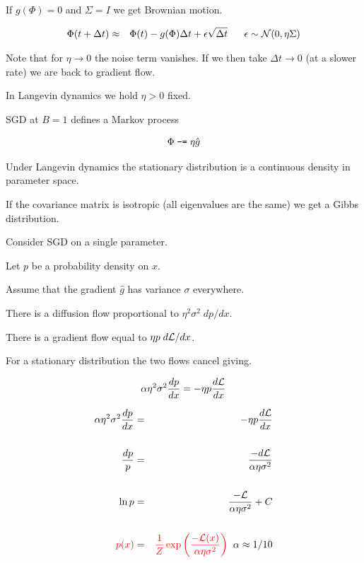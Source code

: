 {\vfill
If $g(\Phi) = 0$ and $\Sigma = I$ we get Brownian motion.


\begin{eqnarray*}
\Phi(t + \Delta t) & \approx & \Phi(t) -g(\Phi)\Delta t + \epsilon\sqrt{\Delta t}\;\;\;\;\;\; \epsilon \sim {\cal N}(0,\eta\Sigma)
\end{eqnarray*}

\vfill
Note that for $\eta \rightarrow 0$ the noise term vanishes.  If we then take $\Delta t \rightarrow 0$ (at a slower rate) we are back to gradient flow.

\vfill
In Langevin dynamics we hold $\eta > 0 $ fixed.


SGD at $B = 1$ defines a Markov process

$$\Phi \;\mbox{\tt -=} \; \eta \hat{g}$$

\vfill
Under Langevin dynamics the stationary distribution is a continuous density in parameter space.

\vfill
If the covariance matrix is isotropic (all eigenvalues are the same) we get a Gibbs distribution.



Consider SGD on a single parameter.

\vfill
Let $p$ be a probability density on $x$.

\vfill
Assume that the gradient $\hat{g}$ has variance $\sigma$ everywhere.

\vfill
There is a diffusion flow proportional to $\eta^2\sigma^2\;dp/dx$.

\vfill
There is a gradient flow equal to $\eta p \;d {\cal L}/dx$.

\vfill
For a stationary distribution the two flows cancel giving.

\vfill
{\color{red} $$\alpha \eta^2 \sigma^2 \frac{dp}{dx} = - \eta p\frac{d{\cal L}}{dx}$$}



\vspace{-2ex}
\begin{eqnarray*}
\alpha \eta^2 \sigma^2 \frac{dp}{dx} & = & - \eta p\frac{d{\cal L}}{dx} \\
\\
\frac{dp}{p} & = & \frac{-d{\cal L}}{\alpha\eta\sigma^2} \\
\\
\ln p & = & \frac{-{\cal L}}{\alpha \eta \sigma^2} + C \\
\\
{\color{red} p(x)} & = & {\color{red} \frac{1}{Z}\exp\left(\frac{-{\cal L}(x)}{\alpha \eta \sigma^2}\right)}\;\;\alpha \approx 1/10
\end{eqnarray*}

}
